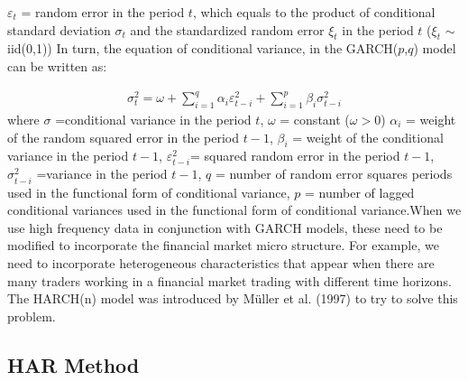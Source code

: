 \documentclass[a4paper,11pt,oneside]{book}
\begin{document}
$\varepsilon_t$ = random error in the period $t$, which equals to the
product of conditional standard deviation $\sigma_t$ and  the
standardized random error $\xi_t$ in the period $t$ ($\xi_t$ $\sim$ iid(0,1))
\newline\newline
In turn, the equation of conditional variance, in the GARCH($p$,$q$) model can be written as:


\begin{equation}
\begin{aligned}
\sigma^2_t = \omega + \sum_{i=1}^{q}\alpha_{i}\varepsilon^{2}_{t-i} + \sum_{i=1}^{p}\beta_{i} \sigma^2_{t-i}
\label{7}
\end{aligned}
\end{equation}
where $\sigma$ =conditional variance in the period $t$,\newline
$\omega$ = constant ($\omega>0$)\newline
$\alpha_{i}$ = weight of the random squared error in the period $t-1$,\newline
$\beta_{i}$ = weight of the conditional variance in the period $t-1$,\newline
$\varepsilon^{2}_{t-i}$= squared random error in the period $t-1$,\newline
$\sigma^2_{t-i}$ =variance in the period $t-1$,\newline
$q$ = number of random error squares periods used in the functional form of conditional variance,\newline
$p$ = number of lagged conditional variances used in the
functional form of conditional variance.\newline\newline When we use high frequency data in conjunction with GARCH models, these need to be modified
to incorporate the financial market micro structure. For example, we need to incorporate heterogeneous
characteristics that appear when there are many traders working in a financial market trading with
different time horizons. The HARCH(n) model was introduced by Müller et al. (1997) to try to solve this problem.

\subsection{HAR Method}
\end{document}
